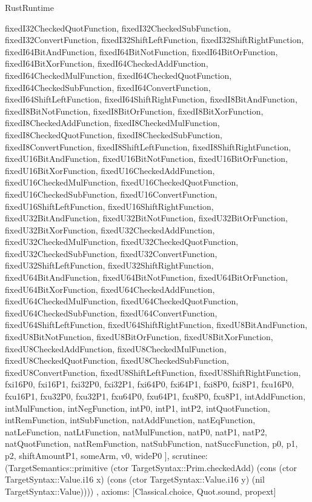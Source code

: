 \begin{lexlean}{RustRuntime}
\begin{semanticmodule}
{{      fixedI32CheckedQuotFunction,
      fixedI32CheckedSubFunction,
      fixedI32ConvertFunction,
      fixedI32ShiftLeftFunction,
      fixedI32ShiftRightFunction,
      fixedI64BitAndFunction,
      fixedI64BitNotFunction,
      fixedI64BitOrFunction,
      fixedI64BitXorFunction,
      fixedI64CheckedAddFunction,
      fixedI64CheckedMulFunction,
      fixedI64CheckedQuotFunction,
      fixedI64CheckedSubFunction,
      fixedI64ConvertFunction,
      fixedI64ShiftLeftFunction,
      fixedI64ShiftRightFunction,
      fixedI8BitAndFunction,
      fixedI8BitNotFunction,
      fixedI8BitOrFunction,
      fixedI8BitXorFunction,
      fixedI8CheckedAddFunction,
      fixedI8CheckedMulFunction,
      fixedI8CheckedQuotFunction,
      fixedI8CheckedSubFunction,
      fixedI8ConvertFunction,
      fixedI8ShiftLeftFunction,
      fixedI8ShiftRightFunction,
      fixedU16BitAndFunction,
      fixedU16BitNotFunction,
      fixedU16BitOrFunction,
      fixedU16BitXorFunction,
      fixedU16CheckedAddFunction,
      fixedU16CheckedMulFunction,
      fixedU16CheckedQuotFunction,
      fixedU16CheckedSubFunction,
      fixedU16ConvertFunction,
      fixedU16ShiftLeftFunction,
      fixedU16ShiftRightFunction,
      fixedU32BitAndFunction,
      fixedU32BitNotFunction,
      fixedU32BitOrFunction,
      fixedU32BitXorFunction,
      fixedU32CheckedAddFunction,
      fixedU32CheckedMulFunction,
      fixedU32CheckedQuotFunction,
      fixedU32CheckedSubFunction,
      fixedU32ConvertFunction,
      fixedU32ShiftLeftFunction,
      fixedU32ShiftRightFunction,
      fixedU64BitAndFunction,
      fixedU64BitNotFunction,
      fixedU64BitOrFunction,
      fixedU64BitXorFunction,
      fixedU64CheckedAddFunction,
      fixedU64CheckedMulFunction,
      fixedU64CheckedQuotFunction,
      fixedU64CheckedSubFunction,
      fixedU64ConvertFunction,
      fixedU64ShiftLeftFunction,
      fixedU64ShiftRightFunction,
      fixedU8BitAndFunction,
      fixedU8BitNotFunction,
      fixedU8BitOrFunction,
      fixedU8BitXorFunction,
      fixedU8CheckedAddFunction,
      fixedU8CheckedMulFunction,
      fixedU8CheckedQuotFunction,
      fixedU8CheckedSubFunction,
      fixedU8ConvertFunction,
      fixedU8ShiftLeftFunction,
      fixedU8ShiftRightFunction,
      fxi16P0,
      fxi16P1,
      fxi32P0,
      fxi32P1,
      fxi64P0,
      fxi64P1,
      fxi8P0,
      fxi8P1,
      fxu16P0,
      fxu16P1,
      fxu32P0,
      fxu32P1,
      fxu64P0,
      fxu64P1,
      fxu8P0,
      fxu8P1,
      intAddFunction,
      intMulFunction,
      intNegFunction,
      intP0,
      intP1,
      intP2,
      intQuotFunction,
      intRemFunction,
      intSubFunction,
      natAddFunction,
      natEqFunction,
      natLeFunction,
      natLtFunction,
      natMulFunction,
      natP0,
      natP1,
      natP2,
      natQuotFunction,
      natRemFunction,
      natSubFunction,
      natSuccFunction,
      p0,
      p1,
      p2,
      shiftAmountP1,
      someArm,
      v0,
      wideP0
    ],
    scrutinee: (TargetSemantics::primitive (ctor TargetSyntax::Prim.checkedAdd) (cons (ctor TargetSyntax::Value.i16 x) (cons (ctor TargetSyntax::Value.i16 y) (nil TargetSyntax::Value))))
  },
  axioms: [Classical.choice, Quot.sound, propext]
}


\end{semanticmodule}
\end{lexlean}
